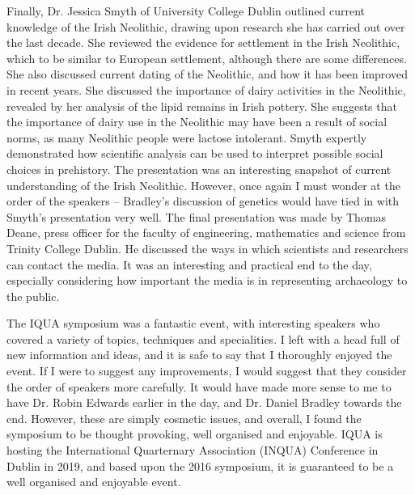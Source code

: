 \documentclass[%
	]{ijsra}
\begin{document}
Finally, Dr. Jessica Smyth of University College Dublin outlined current knowledge of the Irish Neolithic, drawing upon research she has carried out over the last decade. She reviewed the evidence for settlement in the Irish Neolithic, which to be similar to European settlement, although there are some differences. She also discussed current dating of the Neolithic, and how it has been improved in recent years. She discussed the importance of dairy activities in the Neolithic, revealed by her analysis of the lipid remains in Irish pottery. She suggests that the importance of dairy use in the Neolithic may have been a result of social norms, as many Neolithic people were lactose intolerant. Smyth expertly demonstrated how scientific analysis can be used to interpret possible social choices in prehistory. The presentation was an interesting snapshot of current understanding of the Irish Neolithic. However, once again I must wonder at the order of the speakers – Bradley’s discussion of genetics would have tied in with Smyth’s presentation very well. 
The final presentation was made by Thomas Deane, press officer for the faculty of engineering, mathematics and science from Trinity College Dublin. He discussed the ways in which scientists and researchers can contact the media. It was an interesting and practical end to the day, especially considering how important the media is in representing archaeology to the public. 

The IQUA symposium was a fantastic event, with interesting speakers who covered a variety of topics, techniques and specialities. I left with a head full of new information and ideas, and it is safe to say that I thoroughly enjoyed the event. If I were to suggest any improvements, I would suggest that they consider the order of speakers more carefully. It would have made more sense to me to have Dr. Robin Edwards earlier in the day, and Dr. Daniel Bradley towards the end. However, these are simply cosmetic issues, and overall, I found the symposium to be thought provoking, well organised and enjoyable. IQUA is hosting the International Quarternary Association (INQUA) Conference in Dublin in 2019, and based upon the 2016 symposium, it is guaranteed to be a well organised and enjoyable event. 

\IJSRAclosing%
\end{document}
